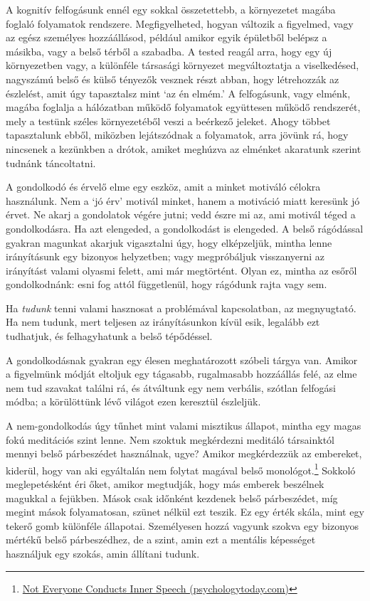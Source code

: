 A kognitív felfogásunk ennél egy sokkal összetettebb, a környezetet
magába foglaló folyamatok rendszere. Megfigyelheted, hogyan változik a
figyelmed, vagy az egész személyes hozzáállásod, például amikor egyik
épületből belépsz a másikba, vagy a belső térből a szabadba. A tested
reagál arra, hogy egy új környezetben vagy, a különféle társasági
környezet megváltoztatja a viselkedésed, nagyszámú belső és külső
tényezők vesznek részt abban, hogy létrehozzák az észlelést, amit úgy
tapasztalsz mint `az én elmém.' A felfogásunk, vagy elménk, magába
foglalja a hálózatban működő folyamatok együttesen működő rendszerét,
mely a testünk széles környezetéből veszi a beérkező jeleket. Ahogy
többet tapasztalunk ebből, miközben lejátszódnak a folyamatok, arra
jövünk rá, hogy nincsenek a kezünkben a drótok, amiket meghúzva az
elménket akaratunk szerint tudnánk táncoltatni.

A gondolkodó és érvelő elme egy eszköz, amit a minket motiváló célokra
használunk. Nem a `jó érv' motivál minket, hanem a motiváció miatt
keresünk jó érvet. Ne akarj a gondolatok végére jutni; vedd észre mi az,
ami motivál téged a gondolkodásra. Ha azt elengeded, a gondolkodást is
elengeded. A belső rágódással gyakran magunkat akarjuk vigasztalni úgy,
hogy elképzeljük, mintha lenne irányításunk egy bizonyos helyzetben;
vagy megpróbáljuk visszanyerni az irányítást valami olyasmi felett, ami
már megtörtént. Olyan ez, mintha az esőről gondolkodnánk: esni fog attól
függetlenül, hogy rágódunk rajta vagy sem.

\enlargethispage*{\baselineskip}

Ha \emph{tudunk} tenni valami hasznosat a problémával kapcsolatban, az
megnyugtató. Ha nem tudunk, mert teljesen az irányításunkon kívül esik,
legalább ezt tudhatjuk, és felhagyhatunk a belső tépődéssel.

A gondolkodásnak gyakran egy élesen meghatározott szóbeli tárgya van.
Amikor a figyelmünk módját eltoljuk egy tágasabb, rugalmasabb hozzáállás
felé, az elme nem tud szavakat találni rá, és átváltunk egy nem
verbális, szótlan felfogási módba; a körülöttünk lévő világot ezen
keresztül észleljük.

A nem-gondolkodás úgy tűnhet mint valami misztikus állapot, mintha egy
magas fokú meditációs szint lenne. Nem szoktuk megkérdezni meditáló
társainktól mennyi belső párbeszédet használnak, ugye? Amikor
megkérdezzük az embereket, kiderül, hogy van aki egyáltalán nem folytat
magával belső monológot.\footnote{\href{https://www.psychologytoday.com/us/blog/pristine-inner-experience/201110/not-everyone-conducts-inner-speech}{Not
  Everyone Conducts Inner Speech (psychologytoday.com)}} Sokkoló
meglepetésként éri őket, amikor megtudják, hogy más emberek beszélnek
magukkal a fejükben. Mások csak időnként kezdenek belső párbeszédet, míg
megint mások folyamatosan, szünet nélkül ezt teszik. Ez egy érték skála,
mint egy tekerő gomb különféle állapotai. Személyesen hozzá vagyunk
szokva egy bizonyos mértékű belső párbeszédhez, de a szint, amin ezt a
mentális képességet használjuk egy szokás, amin állítani tudunk.

